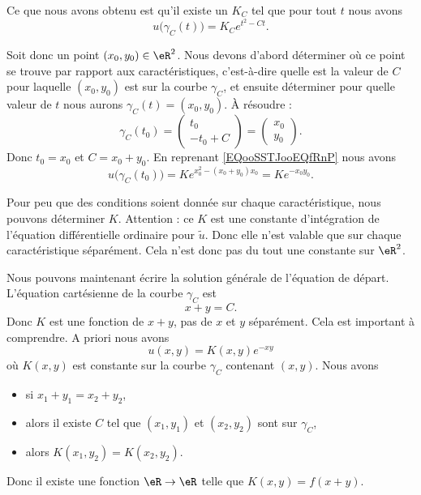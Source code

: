 Ce que nous avons obtenu est qu'il existe un \( K_C\) tel que pour tout \( t\) nous avons
\begin{equation}
    u\big( \gamma_C(t) \big)=K_C e^{t^2-Ct}.
\end{equation}

Soit donc un point \( (x_0,y_0)\in \eR^2\). Nous devons d'abord déterminer où ce point se trouve par rapport aux caractéristiques, c'est-à-dire quelle est la valeur de \( C\) pour laquelle \( (x_0,y_0)\) est sur la courbe \( \gamma_C\), et ensuite déterminer pour quelle valeur de \( t\) nous aurons \( \gamma_C(t)=(x_0,y_0)\). À résoudre :
\begin{equation}
    \gamma_C(t_0)=\begin{pmatrix}
        t_0    \\
        -t_0+C
    \end{pmatrix}=\begin{pmatrix}
        x_0    \\
        y_0
    \end{pmatrix}.
\end{equation}
Donc \( t_0=x_0\) et \( C=x_0+y_0\). En reprenant \eqref{EQooSSTJooEQfRnP} nous avons
\begin{equation}
    u\big( \gamma_C(t_0) \big)=K e^{x_0^2-(x_0+y_0)x_0}=K e^{-x_0y_0}.
\end{equation}

Pour peu que des conditions soient donnée sur chaque caractéristique, nous pouvons déterminer \( K\). Attention : ce \( K\) est une constante d'intégration de l'équation différentielle ordinaire pour \( \tilde u\). Donc elle n'est valable que sur chaque caractéristique séparément. Cela n'est donc pas du tout une constante sur \( \eR^2\).

Nous pouvons maintenant écrire la solution générale de l'équation de départ. L'équation cartésienne de la courbe \( \gamma_C\) est
\begin{equation}
    x+y=C.
\end{equation}
Donc \( K\) est une fonction de \( x+y\), pas de \( x\) et \( y\) séparément. Cela est important à comprendre. A priori nous avons
\begin{equation}
    u(x,y)=K(x,y) e^{-xy}
\end{equation}
où \( K(x,y)\) est constante sur la courbe \( \gamma_C\) contenant \( (x,y)\). Nous avons
\begin{itemize}
    \item si \( x_1+y_1=x_2+y_2\),
    \item alors il existe \( C\) tel que \( (x_1,y_1)\) et \( (x_2,y_2)\) sont sur \( \gamma_C\),
    \item alors \( K(x_1,y_2)=K(x_2,y_2)\).
\end{itemize}
Donc il existe une fonction \( \eR\to \eR\) telle que \( K(x,y)=f(x+y)\).


